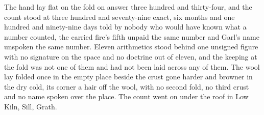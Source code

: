 The hand lay flat on the fold on answer three hundred and thirty-four, and the count stood at three hundred and seventy-nine exact, six months and one hundred and ninety-nine days told by nobody who would have known what a number counted, the carried fire's fifth unpaid the same number and Garl's name unspoken the same number. Eleven arithmetics stood behind one unsigned figure with no signature on the space and no doctrine out of eleven, and the keeping at the fold was not one of them and had not been laid across any of them. The wool lay folded once in the empty place beside the crust gone harder and browner in the dry cold, its corner a hair off the wool, with no second fold, no third crust and no name spoken over the place. The count went on under the roof in Low Kiln, Sill, Grath.
